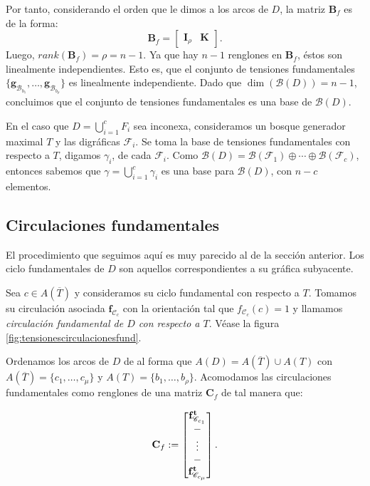 Por tanto, considerando el orden que le dimos a los arcos de $D$, la matriz $\mathbf{B}_{f}$ es de la forma:
$$
\mathbf{B}_{f} = \begin{bmatrix}
\mathbf{I}_{\rho} & \mathbf{K} 
\end{bmatrix}.
$$
Luego, $rank(\mathbf{B}_{f}) = \rho = n-1$. Ya que hay $n -1$ renglones en $\mathbf{B}_{f}$, éstos son linealmente independientes. Esto es, que el conjunto de tensiones fundamentales  $\{\mathbf{g}_{\mathscr{B}_{b_{1}}}, \ldots, \mathbf{g}_{\mathscr{B}_{b_{\rho}}} \}$ es linealmente independiente. Dado que $\dim(\mathcal{B}(D)) = n -1$, concluimos que el conjunto de tensiones fundamentales es una base de $\mathcal{B}(D)$.

En el caso que $D = \bigcup_{i = 1}^{c} F_{i}$ sea inconexa, consideramos  un bosque generador maximal $T$ y las digráficas $\mathcal{F}_{i}$. Se toma la base de tensiones fundamentales con respecto a $T$, digamos $\gamma_{i}$, de cada $\mathcal{F}_{i}$. Como $\mathcal{B}(D) = \mathcal{B}(\mathcal{F}_{1}) \oplus \cdots \oplus \mathcal{B}(\mathcal{F}_{c})$, entonces sabemos que $\gamma = \bigcup_{i =1}^{c}\gamma_{i}$ es una base para $\mathcal{B}(D)$, con $n - c$ elementos.


\subsection{Circulaciones fundamentales}
El procedimiento que seguimos aquí es muy parecido al de la sección anterior. Los ciclo fundamentales de $D$ son aquellos correspondientes a su gráfica subyacente. 

Sea $c \in A(\overline{T})$ y consideramos su ciclo fundamental con respecto a $T$.  Tomamos su circulación asociada $\mathbf{f}_{\mathscr{C}_{c}}$ con la orientación tal que $f_{\mathscr{C}_{c}}(c)=1$ y llamamos \textit{circulación fundamental de $D$ con respecto a $T$}. Véase la figura \ref{fig:tensionescirculacionesfund}.

Ordenamos los arcos de $D$ de al forma que $A(D) = A(\overline{T}) \cup A(T) $ con $A(\overline{T}) = \{c_{1}, \ldots, c_{\mu}\}$ y $A(T) = \{b_{1}, \ldots, b_{\rho}\}$. Acomodamos las circulaciones fundamentales como renglones de una matriz $\mathbf{C}_{f}$ de tal manera que:

$$
\mathbf{C}_{f} := \begin{bmatrix}
\mathbf{f}_{\mathscr{C}_{c_{1}}}^{\mathbf{t}} \\
\-- \\
\vdots \\
\-- \\
\mathbf{f}_{\mathscr{C}_{c_{\mu}}}^{\mathbf{t}}
\end{bmatrix}.
$$

